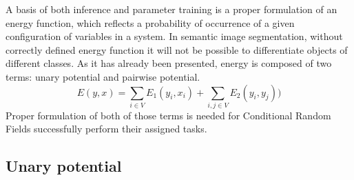 A basis of both inference and parameter training is a proper formulation of an energy function, which reflects a probability of occurrence of a given configuration of variables in a system. In semantic image segmentation, without correctly defined energy function it will not be possible to differentiate objects of different classes. As it has already been presented, energy is composed of two terms: unary potential and pairwise potential. 
\begin{equation}
    E(y,x) = \sum_{i \in V}{E_1(y_i,x_i)} +  \sum_{i,j \in V}{E_2(y_i,y_j)})
\end{equation}
Proper formulation of both of those terms is needed for Conditional Random Fields successfully perform their assigned tasks. 

\subsection{Unary potential}

